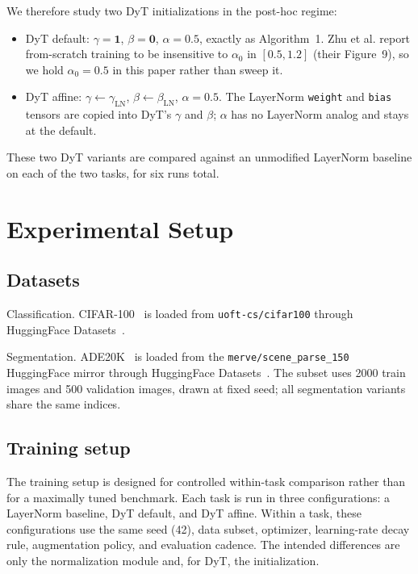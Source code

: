 \documentclass[10pt,twocolumn,letterpaper]{article}
\begin{document}
We therefore study two DyT initializations in the post-hoc regime:
\begin{itemize}
    \item DyT default: $\gamma = \mathbf{1}$, $\beta = \mathbf{0}$, $\alpha = 0.5$, exactly as Algorithm~1. Zhu et al. report from-scratch training to be insensitive to $\alpha_0$ in $[0.5, 1.2]$ (their Figure~9), so we hold $\alpha_0 = 0.5$ in this paper rather than sweep it.
    \item DyT affine: $\gamma \leftarrow \gamma_{\mathrm{LN}}$, $\beta \leftarrow \beta_{\mathrm{LN}}$, $\alpha = 0.5$. The LayerNorm \texttt{weight} and \texttt{bias} tensors are copied into DyT's $\gamma$ and $\beta$; $\alpha$ has no LayerNorm analog and stays at the default.
\end{itemize}

These two DyT variants are compared against an unmodified LayerNorm baseline on each of the two tasks, for six runs total.

\section{Experimental Setup}
\label{sec:setup}

\subsection{Datasets}
\label{subsec:dataset}

\noindent Classification. CIFAR-100~\cite{krizhevsky2009cifar100} is loaded from \texttt{uoft-cs/cifar100} through HuggingFace Datasets~\cite{lhoest2021datasets}.

\noindent Segmentation. ADE20K~\cite{zhou2017ade20k} is loaded from the \texttt{merve/scene\_parse\_150} HuggingFace mirror through HuggingFace Datasets~\cite{lhoest2021datasets}. The subset uses 2000 train images and 500 validation images, drawn at fixed seed; all segmentation variants share the same indices.

\subsection{Training setup}
\label{subsec:training}

The training setup is designed for controlled within-task comparison rather than for a maximally tuned benchmark. Each task is run in three configurations: a LayerNorm baseline, DyT default, and DyT affine. Within a task, these configurations use the same seed (42), data subset, optimizer, learning-rate decay rule, augmentation policy, and evaluation cadence. The intended differences are only the normalization module and, for DyT, the initialization.
\end{document}
